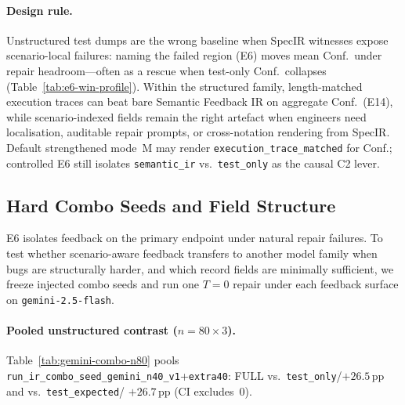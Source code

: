 \paragraph{Design rule.}
Unstructured test dumps are the wrong baseline when SpecIR witnesses expose
scenario-local failures: naming the failed region (E6) moves mean Conf.\ under
repair headroom---often as a rescue when test-only Conf.\ collapses
(Table~\ref{tab:e6-win-profile}).
Within the structured family, length-matched execution traces can beat bare
Semantic Feedback IR on aggregate Conf.\ (E14), while scenario-indexed fields
remain the right artefact when engineers need localisation, auditable repair
prompts, or cross-notation rendering from SpecIR.
Default strengthened mode~M may render
\texttt{execution\_trace\_matched} for Conf.; controlled E6 still isolates
\texttt{semantic\_ir} vs.\ \texttt{test\_only} as the causal C2 lever.

\begin{table}[H]
  \caption{E14 length-matched feedback sweep ($n{=}120$ tasks per variant).}
  \label{tab:e14-feedback}
  \centering
\end{table}

\subsection{Hard Combo Seeds and Field Structure}
\label{sec:results:gemini-combo}

E6 isolates feedback on the primary endpoint under natural repair failures.
To test whether scenario-aware feedback transfers to another model family
when bugs are structurally harder, and which record fields are minimally
sufficient, we freeze injected combo seeds and run one $T{=}0$ repair under
each feedback surface on \texttt{gemini-2.5-flash}.

\paragraph{Pooled unstructured contrast ($n{=}80{\times}3$).}
Table~\ref{tab:gemini-combo-n80} pools
\texttt{run\_ir\_combo\_seed\_gemini\_n40\_v1}+\texttt{extra40}:
FULL vs.\ \texttt{test\_only}/${+}26.5$\,pp and vs.\ \texttt{test\_expected}/
${+}26.7$\,pp (CI excludes~0).

